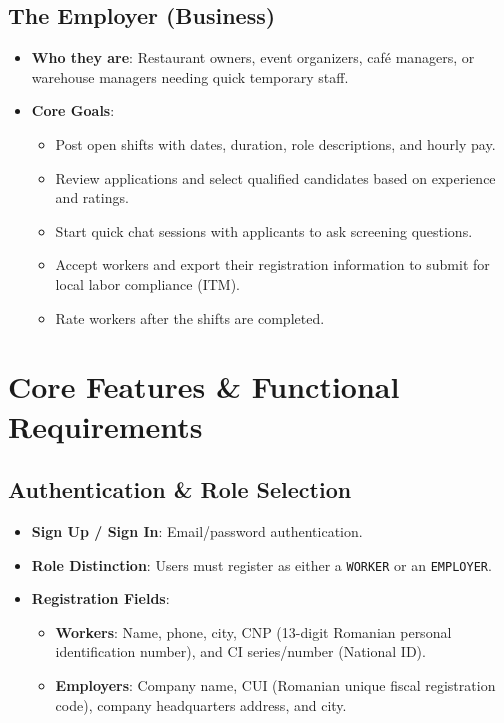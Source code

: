 \documentclass{article}
\begin{document}
\subsection{The Employer (Business)}
\begin{itemize}
    \item \textbf{Who they are}: Restaurant owners, event organizers, café managers, or warehouse managers needing quick temporary staff.
    \item \textbf{Core Goals}:
    \begin{itemize}
        \item Post open shifts with dates, duration, role descriptions, and hourly pay.
        \item Review applications and select qualified candidates based on experience and ratings.
        \item Start quick chat sessions with applicants to ask screening questions.
        \item Accept workers and export their registration information to submit for local labor compliance (ITM).
        \item Rate workers after the shifts are completed.
    \end{itemize}
\end{itemize}

\section{Core Features \& Functional Requirements}

\subsection{Authentication \& Role Selection}
\begin{itemize}
    \item \textbf{Sign Up / Sign In}: Email/password authentication.
    \item \textbf{Role Distinction}: Users must register as either a \texttt{WORKER} or an \texttt{EMPLOYER}.
    \item \textbf{Registration Fields}:
    \begin{itemize}
        \item \textbf{Workers}: Name, phone, city, CNP (13-digit Romanian personal identification number), and CI series/number (National ID).
        \item \textbf{Employers}: Company name, CUI (Romanian unique fiscal registration code), company headquarters address, and city.
    \end{itemize}
\end{itemize}
\end{document}
